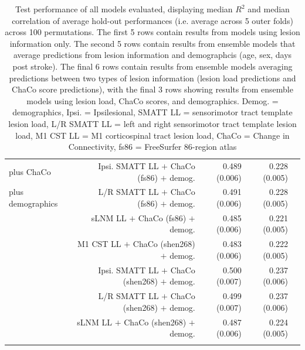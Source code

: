 \documentclass[10pt]{article}
\def\Plus{\texttt{+}}
\begin{document}
\begin{table}[h]
\begin{tabular}{lrrrr}
 plus ChaCo & Ipsi. SMATT LL $\Plus$ ChaCo  (fs86) $\Plus$ demog. & 0.489 (0.006) & 0.228 (0.005) \\
 plus demographics & L/R SMATT LL $\Plus$ ChaCo  (fs86) $\Plus$ demog. & 0.491 (0.006) & 0.228 (0.005) \\
 & sLNM LL $\Plus$ ChaCo  (fs86) $\Plus$ demog. & 0.485 (0.006) & 0.221 (0.005) \\
 & M1 CST LL $\Plus$ ChaCo  (shen268) $\Plus$ demog. & 0.483 (0.006) & 0.222 (0.005) \\
 & Ipsi. SMATT LL $\Plus$ ChaCo  (shen268) $\Plus$ demog. & 0.500 (0.007) & 0.237 (0.006) \\
 & L/R SMATT LL $\Plus$ ChaCo  (shen268) $\Plus$ demog. & 0.499 (0.007) & 0.237 (0.006) \\
 & sLNM LL $\Plus$ ChaCo  (shen268) $\Plus$ demog. & 0.487 (0.006) & 0.224 (0.005) \\

 \arrayrulecolor{black}\bottomrule
\end{tabular}
\caption{Test performance of all models evaluated, displaying median $R^2$ and median correlation of average hold-out performances (i.e. average across 5 outer folds) across 100 permutations. The first 5 rows contain results from models using lesion information only. The second 5 rows contain results from ensemble models that average predictions from lesion information and demographcis (age, sex, days post stroke). The final 6 rows contain results from ensemble models averaging predictions between two types of lesion information (lesion load predictions and ChaCo score predictions), with the final 3 rows showing results from ensemble models using lesion load, ChaCo scores, and demographics. Demog. = demographics, Ipsi. = Ipsilesional, SMATT LL = sensorimotor tract template lesion load, L/R SMATT LL = left and right sensorimotor tract template lesion load, M1 CST LL = M1 corticospinal tract lesion load, ChaCo = Change in Connectivity, fs86 = FreeSurfer 86-region atlas}
\label{results_table_acutechronic}

\end{table}
\end{document}
